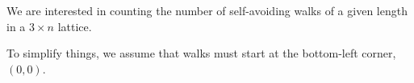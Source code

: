 We are interested in counting the number of self-avoiding walks of a given length in a $3\times n$ lattice. 

To simplify things, we assume that walks must start at the bottom-left corner, $(0, 0)$. 
